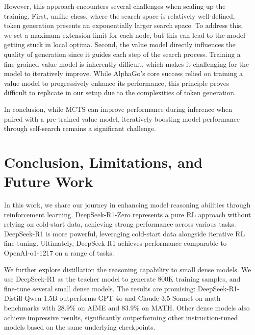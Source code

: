 \documentclass[11pt, a4paper, logo, copyright, nonumbering]{deepseek}
\newcommand{\dsri}{DeepSeek-R1}
\newcommand{\dsro}{DeepSeek-R1-Zero}
\begin{document}
However, this approach encounters several challenges when scaling up the training. First, unlike chess, where the search space is relatively well-defined, token generation presents an exponentially larger search space. To address this, we set a maximum extension limit for each node, but this can lead to the model getting stuck in local optima. Second, the value model directly influences the quality of generation since it guides each step of the search process. Training a fine-grained value model is inherently difficult, which makes it challenging for the model to iteratively improve. While AlphaGo's core success relied on training a value model to progressively enhance its performance, this principle proves difficult to replicate in our setup due to the complexities of token generation.

In conclusion, while MCTS can improve performance during inference when paired with a pre-trained value model, iteratively boosting model performance through self-search remains a significant challenge.




\section{Conclusion, Limitations, and Future Work}

In this work, we share our journey in enhancing model reasoning abilities through reinforcement learning. \dsro{} represents a pure RL approach without relying on cold-start data, achieving strong performance across various tasks. \dsri{} is more powerful, leveraging cold-start data alongside iterative RL fine-tuning. Ultimately, \dsri{} achieves performance comparable to OpenAI-o1-1217 on a range of tasks.

We further explore distillation the reasoning capability to small dense models. We use \dsri{} as the teacher model to generate 800K training samples, and fine-tune several small dense models. The results are promising: DeepSeek-R1-Distill-Qwen-1.5B outperforms GPT-4o and Claude-3.5-Sonnet on math benchmarks with 28.9\% on AIME and 83.9\% on MATH. Other dense models also achieve impressive results, significantly outperforming other instruction-tuned models based on the same underlying checkpoints.
\end{document}
